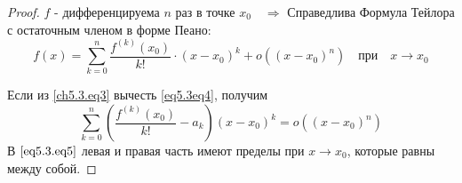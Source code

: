 \begin{proof}
$f$ - дифференцируема $n$ раз в точке $x_0 \quad \Rightarrow$
Справедлива Формула Тейлора с остаточным членом в форме Пеано:
\begin{equation} \label{eq5.3eq4}
f(x) = \sum_{k = 0}^{n} \frac{f^{(k)}(x_0)}{k!} \cdot (x - x_0)^k + o((x - x_0)^n) \quad \text{при} \quad x \to x_0
\end{equation}

Если из \eqref{ch5.3.eq3} вычесть \eqref{eq5.3eq4}, получим
\begin{equation} \label{eq5.3.eq5}
\sum\limits_{k = 0}^{n} \left( \frac{f^{(k)}(x_0)}{k!} - a_k \right) (x - x_0)^k = o((x - x_0)^n)
\end{equation}
В $\eqref{eq5.3.eq5}$ левая и правая часть имеют пределы при $x \to x_0$, которые равны между собой.
\end{proof}